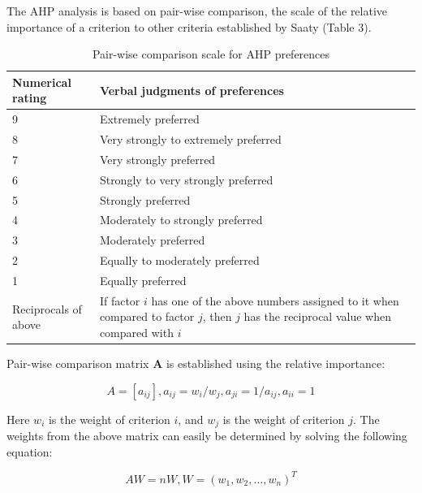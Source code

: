 \documentclass{mcmthesis}
\begin{document}
The AHP analysis is based on pair-wise comparison, the scale of the relative importance of a criterion to other criteria established by Saaty (Table 3)\cite{Leung1998Evaluating}. 

\begin{table}[!ht]
\caption{Pair-wise comparison scale for AHP preferences}
 \renewcommand\arraystretch{1.5}
 \setlength{\abovecaptionskip}{0pt}%
\setlength{\belowcaptionskip}{10pt}%
\begin{center}
\begin{tabular}{p{}<{\centering} p{}}
\toprule[1.5pt]
Numerical rating & Verbal judgments of preferences  \\
 \midrule

 9 & Extremely preferred \\
8 & Very strongly to extremely preferred \\
7 & Very strongly preferred \\
6 & Strongly to very strongly preferred \\
5 & Strongly preferred \\
4 & Moderately to strongly preferred \\
3 & Moderately preferred \\
2 & Equally to moderately preferred \\
1 & Equally preferred \\
Reciprocals of above & If factor $i$ has one of the above numbers assigned to it when compared to factor $j$, then $j$ has the reciprocal value when compared with $i$\\

 \bottomrule[1.5pt]
 \end{tabular}
 \end{center} 
 \end{table}

Pair-wise comparison matrix {\bf{A}} is established using the relative importance:

\begin{equation}\label{6}
A=\left[a_{ij}\right], a_{ij}=w_i/w_j, a_{ji}=1/a_{ij}, a_{ii}=1
\end{equation}

Here $w_i$ is the weight of criterion $i$, and $w_j$ is the weight of criterion $j$. The weights from the above matrix can easily be determined by solving the following equation:

\begin{equation}\label{7}
AW=nW, W=\left(w_1,w_2,\dots,w_n\right)^T
\end{equation}
\end{document}
